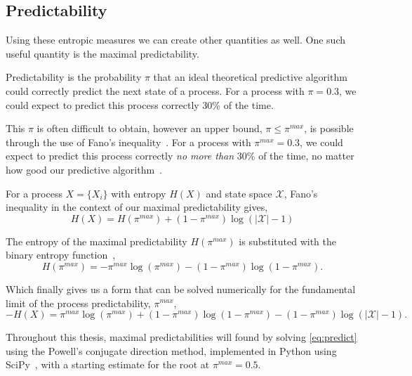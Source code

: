 \subsection{Predictability}

Using these entropic measures we can create other quantities as well. One such useful quantity is the maximal predictability.

Predictability is the probability $\pi$ that an ideal theoretical predictive algorithm could correctly predict the next state of a process. For a process with $\pi = 0.3$, we could expect to predict this process correctly 30\% of the time. 

This $\pi$ is often difficult to obtain, however an upper bound, $\pi \leq \pi^{max}$, is possible through the use of Fano's inequality~\cite{fano_transmission_1961}.  For a process with $\pi^{max} = 0.3$, we could expect to predict this process correctly \emph{no more than} 30\% of the time, no matter how good our predictive algorithm~\cite{song_limits_2010}.


\begin{definition}\label{def:maximialpredictability}
For a process $X = \{ X_i \}$ with entropy $H(X)$ and state space $\mathcal{X}$, Fano's inequality in the context of our maximal predictability gives,
\begin{equation}
H(X) = H(\pi^{max}) + (1 - \pi^{max}) \log (|\mathcal{X}| - 1)
\end{equation}
\end{definition}

The entropy of the maximal predictability $H(\pi^{max})$ is substituted with the binary entropy function~\cite{song_limits_2010},   
\begin{equation}
H(\pi^{max}) = -\pi^{max} \log(\pi^{max}) - (1 -  \pi^{max}) \log(1 - \pi^{max}).
\end{equation}

Which finally gives us a form that can be solved numerically for the fundamental limit of the process predictability, $\pi^{max}$,
\begin{equation}\label{eq:predict}
-H(X)  = \pi^{max} \log(\pi^{max}) + (1 -  \pi^{max}) \log(1 - \pi^{max}) - (1 - \pi^{max}) \log (|\mathcal{X}| - 1).
\end{equation}


Throughout this thesis, maximal predictabilities will found by solving \autoref{eq:predict} using the Powell's conjugate direction method, implemented in Python using SciPy~\cite{virtanen_scipy_2019}, with a starting estimate for the root at $\pi^{max}=0.5$.

